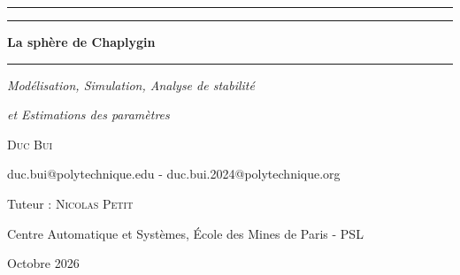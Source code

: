 \documentclass[11pt,a4paper]{report}
\begin{document}

\begin{titlepage}
    \centering


    \par
    \vspace{0.35cm}
    {\color{accent}\rule{0.35\textwidth}{0.6pt}}\par

    \vspace{1.6cm}
    \vspace{3cm}


    {\color{accent}\rule{\textwidth}{1.1pt}}\par
    \vspace{0.85cm}

    {\Huge\bfseries
        La sphère de Chaplygin\par}

    \vspace{0.85cm}
    {\color{accent}\rule{\textwidth}{1.1pt}}\par

    \vspace{1.1cm}
    {\Large\itshape Modélisation, Simulation, Analyse de stabilité
    \par}
    \vspace{0.3cm}
    {\Large\itshape et Estimations des paramètres\par}
    \vspace{0.3cm}


    {\large\scshape Duc Bui\par}
    \vspace{0.25cm}
    {\small\color{black!60} duc.bui@polytechnique.edu - duc.bui.2024@polytechnique.org\par}

    \vspace{0.9cm}
    {\normalsize Tuteur : \textsc{Nicolas Petit}\par}
    \vspace{0.15cm}
    {\small Centre Automatique et Systèmes, École des Mines de Paris -
    PSL\par}

    {\large Octobre 2026\par}

\end{titlepage}
\end{document}
